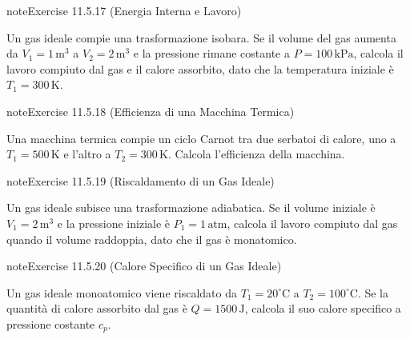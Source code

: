 \documentclass[letterpaper,10pt,italian]{jupyterBook}
\begin{document}
\begin{sphinxadmonition}{note}{Exercise 11.5.17 (Energia Interna e Lavoro)}



\sphinxAtStartPar
Un gas ideale compie una trasformazione isobara. Se il volume del gas aumenta da \(V_1 = 1 \, \text{m}^3\) a \(V_2 = 2 \, \text{m}^3\) e la pressione rimane costante a \(P = 100 \, \text{kPa}\), calcola il lavoro compiuto dal gas e il calore assorbito, dato che la temperatura iniziale è \(T_1 = 300 \, \text{K}\).
\end{sphinxadmonition}
 \label{exercise:ch/thermodynamics/foundation-problems-exercise-17}

\begin{sphinxadmonition}{note}{Exercise 11.5.18 (Efficienza di una Macchina Termica)}



\sphinxAtStartPar
Una macchina termica compie un ciclo Carnot tra due serbatoi di calore, uno a \(T_1 = 500 \, \text{K}\) e l’altro a \(T_2 = 300 \, \text{K}\). Calcola l’efficienza della macchina.
\end{sphinxadmonition}
 \label{exercise:ch/thermodynamics/foundation-problems-exercise-18}

\begin{sphinxadmonition}{note}{Exercise 11.5.19 (Riscaldamento di un Gas Ideale)}



\sphinxAtStartPar
Un gas ideale subisce una trasformazione adiabatica. Se il volume iniziale è \(V_1 = 2 \, \text{m}^3\) e la pressione iniziale è \(P_1 = 1 \, \text{atm}\), calcola il lavoro compiuto dal gas quando il volume raddoppia, dato che il gas è monatomico.
\end{sphinxadmonition}
 \label{exercise:ch/thermodynamics/foundation-problems-exercise-19}

\begin{sphinxadmonition}{note}{Exercise 11.5.20 (Calore Specifico di un Gas Ideale)}



\sphinxAtStartPar
Un gas ideale monoatomico viene riscaldato da \(T_1 = 20^\circ \text{C}\) a \(T_2 = 100^\circ \text{C}\). Se la quantità di calore assorbito dal gas è \(Q = 1500 \, \text{J}\), calcola il suo calore specifico a pressione costante \(c_p\).
\end{sphinxadmonition}
 \label{exercise:ch/thermodynamics/foundation-problems-exercise-20}
\end{document}
